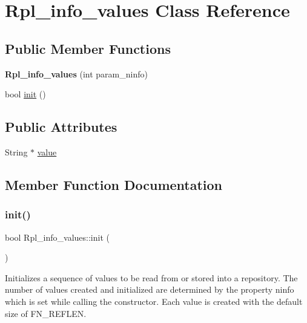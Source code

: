 \hypertarget{classRpl__info__values}{}\section{Rpl\+\_\+info\+\_\+values Class Reference}
\label{classRpl__info__values}
\subsection*{Public Member Functions}
\begin{DoxyCompactItemize}
\item 
\mbox{\label{classRpl__info__values_a89869a5218a006b5534620ce7d5af6ae}} 
{\bfseries Rpl\+\_\+info\+\_\+values} (int param\+\_\+ninfo)
\item 
bool \mbox{\hyperlink{classRpl__info__values_ac28fe760258143ef491bff911237eb80}{init}} ()
\end{DoxyCompactItemize}
\subsection*{Public Attributes}
\begin{DoxyCompactItemize}
\item 
String $\ast$ \mbox{\hyperlink{classRpl__info__values_a36dafe666e67700c9d7f573d9f0a4c66}{value}}
\end{DoxyCompactItemize}


\subsection{Member Function Documentation}
\mbox{\label{classRpl__info__values_ac28fe760258143ef491bff911237eb80}} 
\subsubsection{\texorpdfstring{init()}{init()}}
{\footnotesize\ttfamily bool Rpl\+\_\+info\+\_\+values\+::init (\begin{DoxyParamCaption}{ }\end{DoxyParamCaption})}

Initializes a sequence of values to be read from or stored into a repository. The number of values created and initialized are determined by the property {\ttfamily ninfo} which is set while calling the constructor. Each value is created with the default size of {\ttfamily F\+N\+\_\+\+R\+E\+F\+L\+EN}.


